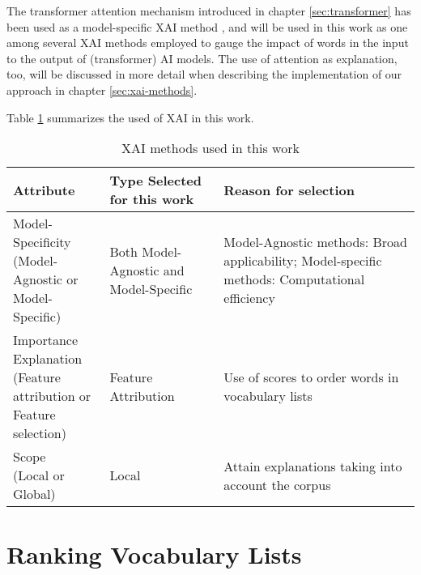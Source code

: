 The transformer attention mechanism introduced in chapter \ref{sec:transformer} has been used as a model-specific XAI method
\cite{liUnderstandingNeuralNetworks2017}
\cite{leiInterpretableNeuralModels2017}
, and will be used in this work as one among several XAI methods employed to gauge the impact of words in the input to the output of (transformer) AI models.
The use of attention as explanation, too, will be discussed in more detail when describing the implementation of our approach in chapter \ref{sec:xai-methods}.

Table \ref{table:XAi-method-criteria} summarizes the used of XAI in this work.

\begin{table}[ht]
	\centering
	\begin{tabularx}{\textwidth}{|X|X|X|}
		\hline
		\textbf{Attribute} & \textbf{Type Selected for this work} & \textbf{Reason for selection} \\
		\hline
		\makecell[l]{Model-Specificity                                                            \\(Model-Agnostic or \\Model-Specific)} & Both Model-Agnostic and Model-Specific & Model-Agnostic methods: Broad applicability; Model-specific methods: Computational efficiency \\
		\hline
		\makecell[l]{Importance Explanation                                                       \\(Feature attribution or \\Feature selection)}                                 & Feature Attribution                 & Use of scores to order words in vocabulary lists                                                                        \\
		\hline
		\makecell[l]{Scope                                                                        \\(Local or Global)}                                                       & Local                                  & Attain explanations taking into account the corpus                                          \\
		\hline
	\end{tabularx}
	\caption{XAI methods used in this work}
	\label{table:XAi-method-criteria}
\end{table}

\section{Ranking Vocabulary Lists} \label{sec:ranking-lists-of-vocabulary}

